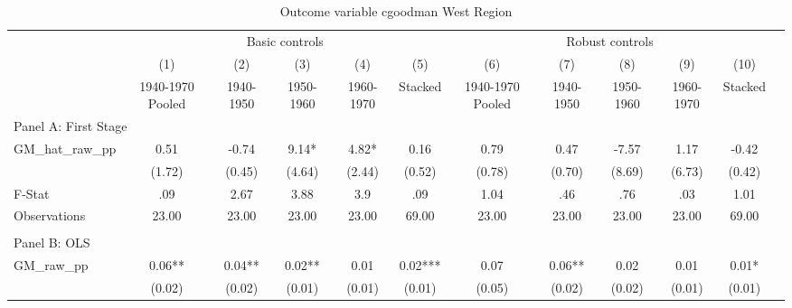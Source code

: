  \begin{table}[htbp]\centering {} \begin{threeparttable} \caption{Outcome variable cgoodman West Region} \begin{tabular}{l*{11}{c}} \toprule
          &\multicolumn{5}{c}{Basic controls}                                   &\multicolumn{5}{c}{Robust controls}                                  \\\cmidrule(lr){2-6}\cmidrule(lr){7-11}
          &\multicolumn{1}{c}{(1)}&\multicolumn{1}{c}{(2)}&\multicolumn{1}{c}{(3)}&\multicolumn{1}{c}{(4)}&\multicolumn{1}{c}{(5)}&\multicolumn{1}{c}{(6)}&\multicolumn{1}{c}{(7)}&\multicolumn{1}{c}{(8)}&\multicolumn{1}{c}{(9)}&\multicolumn{1}{c}{(10)}\\
          &\multicolumn{1}{c}{1940-1970 Pooled}&\multicolumn{1}{c}{1940-1950}&\multicolumn{1}{c}{1950-1960}&\multicolumn{1}{c}{1960-1970}&\multicolumn{1}{c}{Stacked}&\multicolumn{1}{c}{1940-1970 Pooled}&\multicolumn{1}{c}{1940-1950}&\multicolumn{1}{c}{1950-1960}&\multicolumn{1}{c}{1960-1970}&\multicolumn{1}{c}{Stacked}\\
\cmidrule(lr){1-11}
\multicolumn{10}{l}{Panel A: First Stage}\\
\cmidrule(lr){1-11}
GM\_hat\_raw\_pp&      0.51   &     -0.74   &      9.14*  &      4.82*  &      0.16   &      0.79   &      0.47   &     -7.57   &      1.17   &     -0.42   \\
          &    (1.72)   &    (0.45)   &    (4.64)   &    (2.44)   &    (0.52)   &    (0.78)   &    (0.70)   &    (8.69)   &    (6.73)   &    (0.42)   \\
\midrule
F-Stat    &       .09   &      2.67   &      3.88   &       3.9   &       .09   &      1.04   &       .46   &       .76   &       .03   &      1.01   \\
Observations&     23.00   &     23.00   &     23.00   &     23.00   &     69.00   &     23.00   &     23.00   &     23.00   &     23.00   &     69.00   \\
\cmidrule[\heavyrulewidth](lr){1-11} \\ \cmidrule[\heavyrulewidth](lr){1-11}
\multicolumn{10}{l}{Panel B: OLS}\\
\cmidrule(lr){1-11}
GM\_raw\_pp &      0.06** &      0.04** &      0.02** &      0.01   &      0.02***&      0.07   &      0.06** &      0.02   &      0.01   &      0.01*  \\
          &    (0.02)   &    (0.02)   &    (0.01)   &    (0.01)   &    (0.01)   &    (0.05)   &    (0.02)   &    (0.02)   &    (0.01)   &    (0.01)   \\

\end{tabular}
\end{threeparttable}
\end{table}

